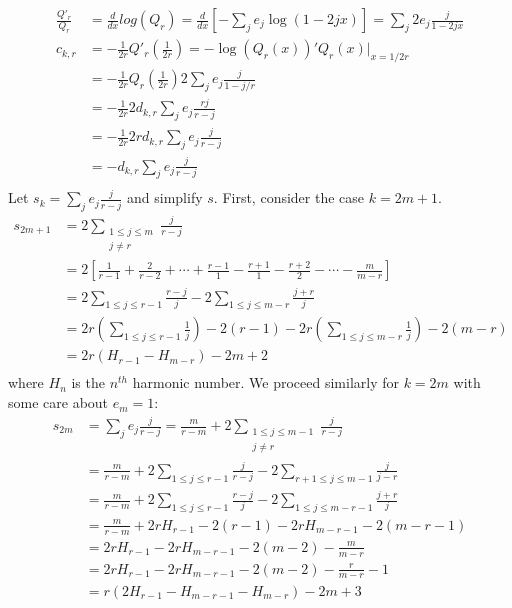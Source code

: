 \documentclass[a4paper]{amsart}
\begin{document}
$$ 
\begin{aligned}
    \frac{Q'_{r}}{Q_r} &= \frac{d}{dx}log(Q_r) = \frac{d}{dx}\left[ -\sum_{j} e_j\log(1-2jx) \right]=  \sum_{j} 2e_j\frac{j}{1-2jx}  \\
    c_{k,r} &= - \frac{1}{2r}Q'_r\left (\frac{1}{2r} \right) = -\log(Q_r(x))'Q_r(x)|_{x=1/{2r}} \\
    &= -\frac{1}{2r} Q_r\left(\frac{1}{2r}\right) 2\sum_{j} e_j\frac{j}{1-j/r} \\ 
    &= -\frac{1}{2r} 2 d_{k,r}\sum_{j}e_j\frac{rj }{r-j} \\
    &= - \frac{1}{2r}2r d_{k,r}\sum_{j}e_j \frac{j}{r-j} \\
    &= - d_{k,r}\sum_{j}e_j \frac{j}{r-j} \\
\end{aligned}
$$
Let $s_k=\sum_{j}e_j\frac{j}{r-j}$ and simplify $s$. First, consider the case $k=2m+1$. 
$$
\begin{aligned}
    s_{2m+1} &=  2\sum_{\substack{1 \leq j \leq m \\ j \neq r}}\frac{j}{r-j} \\ 
    &= 2\left[\frac{1}{r-1}+\frac{2}{r-2} + \cdots  + \frac{r-1}{1}-\frac{r+1}{1}-\frac{r+2}{2}-\cdots-\frac{m}{m-r}\right]\\
    &= 2\sum_{1 \leq j \leq r-1}\frac{r-j}{j} -2\sum_{1 \leq j \leq m-r}\frac{j+r}{j} \\
    &= 2r\left(\sum_{1 \leq j \leq r-1}\frac{1}{j}\right) - 2(r-1) - 2r\left(\sum_{1 \leq j \leq m-r}\frac{1}{j}\right)-2(m-r)\\
    &= 2r(H_{r-1}-H_{m-r})-2m+2 \\
\end{aligned}
$$
where $H_n$ is the $n^{th}$ harmonic number. We proceed similarly for $k=2m$ with some care about $e_{m}=1$:
$$
\begin{aligned}
    s_{2m} &= \sum_{j}e_j \frac{j}{r-j} = \frac{m}{r-m} + 2\sum_{\substack{1 \leq j \leq m-1 \\ j \neq r}}\frac{j}{r-j}\\ 
    &= \frac{m}{r-m} + 2 \sum_{1 \leq j \leq r-1} \frac{j}{r-j} - 2\sum_{r+1 \leq j \leq m-1}\frac{j}{j-r} \\
    &= \frac{m}{r-m} + 2\sum_{1 \leq j \leq r-1}\frac{r-j}{j} -2\sum_{1 \leq j \leq m-r-1}\frac{j+r}{j} \\
    &= \frac{m}{r-m} + 2rH_{r-1}-2(r-1)-2rH_{m-r-1}-2(m-r-1) \\
    &=  2rH_{r-1} - 2rH_{m-r-1}-2(m-2)-\frac{m}{m-r}  \\
    &= 2rH_{r-1} - 2rH_{m-r-1} - 2(m-2) - \frac{r}{m-r} -1 \\
    &= r\left(2H_{r-1} - H_{m-r-1}-H_{m-r}\right) - 2m + 3
\end{aligned}
$$
\end{document}

